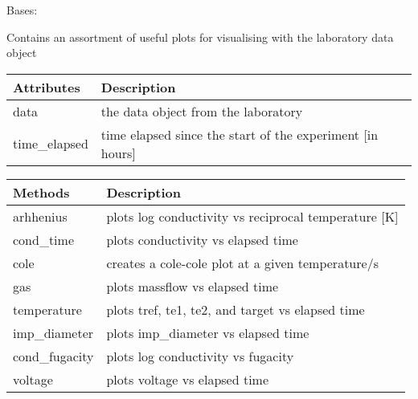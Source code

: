 \documentclass[letterpaper,10pt,english]{sphinxmanual}
\begin{document}
\begin{fulllineitems}
\label{\detokenize{source/laboratory.utils:laboratory.utils.plotting.LabPlots}}
Bases: 

Contains an assortment of useful plots for visualising with the laboratory data object


\begin{savenotes}\sphinxattablestart
\centering
\begin{tabulary}{\linewidth}[t]{|T|T|}
\hline
\sphinxstyletheadfamily 
Attributes
&\sphinxstyletheadfamily 
Description
\\
\hline
data
&
the data object from the laboratory
\\
\hline
time\_elapsed
&
time elapsed since the start of the experiment {[}in hours{]}
\\
\hline
\end{tabulary}
\par
\sphinxattableend\end{savenotes}


\begin{savenotes}\sphinxattablestart
\centering
\begin{tabulary}{\linewidth}[t]{|T|T|}
\hline
\sphinxstyletheadfamily 
Methods
&\sphinxstyletheadfamily 
Description
\\
\hline
arhhenius
&
plots log conductivity vs reciprocal temperature {[}K{]}
\\
\hline
cond\_time
&
plots conductivity vs elapsed time
\\
\hline
cole
&
creates a cole-cole plot at a given temperature/s
\\
\hline
gas
&
plots massflow vs elapsed time
\\
\hline
temperature
&
plots tref, te1, te2, and target vs elapsed time
\\
\hline
imp\_diameter
&
plots imp\_diameter vs elapsed time
\\
\hline
cond\_fugacity
&
plots log conductivity vs fugacity
\\
\hline
voltage
&
plots voltage vs elapsed time
\\
\hline
\end{tabulary}
\par
\sphinxattableend\end{savenotes}


\end{fulllineitems}
\end{document}
